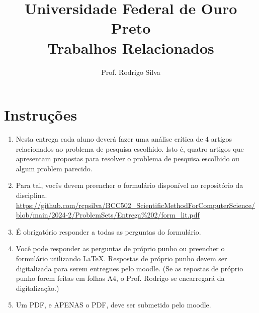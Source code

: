 \documentclass{article}
\title{\vspace{-2 cm}Universidade Federal de Ouro Preto \\ \textbf{Trabalhos Relacionados}}
\author{Prof. Rodrigo Silva}
\date{}
\begin{document}
\maketitle

\section*{Instruções}

\begin{enumerate}
    \item Nesta entrega cada aluno deverá fazer uma análise crítica de 4 artigos relacionados ao problema de pesquisa escolhido. Isto é, quatro artigos que apresentam propostas para resolver o problema de pesquisa escolhido ou algum problem parecido. 
    \item Para tal, vocês devem preencher o formulário disponível no repositório da disciplina. \url{https://github.com/rcpsilva/BCC502_ScientificMethodForComputerScience/blob/main/2024-2/ProblemSets/Entrega%202/form_lit.pdf}
    \item É obrigatório responder a todas as perguntas do formulário. 
    \item Você pode responder as perguntas de próprio punho ou preencher o formulário utilizando LaTeX. Respostas de próprio punho devem ser digitalizada para serem entregues pelo moodle. (Se as repostas de próprio punho forem feitas em folhas A4, o Prof. Rodrigo se encarregará da digitalização.)
    \item Um PDF, e APENAS o PDF, deve ser submetido pelo moodle.  
\end{enumerate}    




%
%
\end{document}
